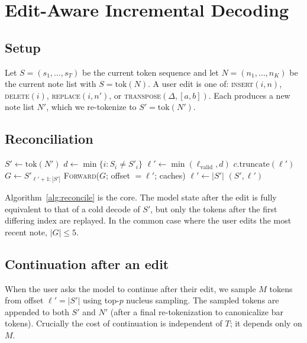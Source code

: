 \documentclass[11pt,a4paper]{article}
\begin{document}
\section{Edit-Aware Incremental Decoding}\label{sec:edits}

\subsection{Setup}

Let $S = (s_1,\dots,s_T)$ be the current token sequence and let
$N = (n_1,\dots,n_K)$ be the current note list with $S = \mathrm{tok}(N)$.
A user edit is one of:
\textsc{insert}$(i, n)$, \textsc{delete}$(i)$, \textsc{replace}$(i, n')$,
or \textsc{transpose}$(\Delta, [a,b])$. Each produces a new note list
$N'$, which we re-tokenize to $S' = \mathrm{tok}(N')$.

\subsection{Reconciliation}

\begin{algorithm}[t]
\caption{Reconcile-and-replay}\label{alg:reconcile}
\begin{algorithmic}[1]
  \State $S' \gets \mathrm{tok}(N')$
  \State $d \gets \min\{i : S_i \ne S'_i\}$ 
  \State $\ell' \gets \min(\ell_{\text{valid}}, d)$
    \State $c.\text{truncate}(\ell')$
  \EndFor
  \State $G \gets S'_{\ell'+1 : |S'|}$ 
    \State \textsc{Forward}($G$; offset $=\ell'$; caches) 
    \State $\ell' \gets |S'|$
  \EndIf
  \State \Return $(S', \ell')$
\EndFunction
\end{algorithmic}
\end{algorithm}

Algorithm~\ref{alg:reconcile} is the core. The model state after the
edit is fully equivalent to that of a cold decode of $S'$, but only the
tokens after the first differing index are replayed. In the common case
where the user edits the most recent note, $|G|\le 5$.

\subsection{Continuation after an edit}

When the user asks the model to continue after their edit, we sample
$M$ tokens from offset $\ell'=|S'|$ using top-$p$ nucleus sampling. The
sampled tokens are appended to both $S'$ and $N'$ (after a final
re-tokenization to canonicalize bar tokens). Crucially the cost of
continuation is independent of $T$; it depends only on $M$.
\end{document}
